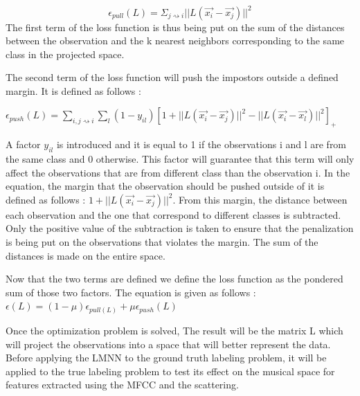 \documentclass[hidelinks,12pt]{report}
\begin{document}
 $$\epsilon_{pull}(L)=\Sigma_{j \rightsquigarrow i}||L(\vec{x_i}-\vec{x_j})||^2$$
 The first term of the loss function is thus being put on the sum of the distances between the observation and the k nearest neighbors corresponding to the same class in the projected space.\par
The second term of the loss function will push the impostors outside a defined margin. It is defined as follows : \par 
$\epsilon_{push}(L)=\sum\limits_{i, j \rightsquigarrow i}\sum\limits_{l}(1-y_{il})[1+||L(\vec{x_i}-\vec{x_j})||^2-||L(\vec{x_i}-\vec{x_l})||^2]_+$ \par 
A factor $y_{il}$ is introduced and it is equal to 1 if the observations i and l are from the same class and 0 otherwise. This factor will guarantee that this term will only affect the observations that are from different class than the observation i. In the equation, the margin that the observation should be pushed outside of it is defined as follows : $1+||L(\vec{x_i}-\vec{x_j})||^2$. From this margin, the distance between each observation and the one that correspond to different classes is subtracted. Only the positive value of the subtraction is taken to ensure that the penalization is being put on the observations that violates the margin. The sum of the distances is made on the entire space.\par 
Now that the two terms are defined we define the loss function as the pondered sum of those two factors. The equation is given as follows : 
$\epsilon(L)=(1-\mu)\epsilon_{pull(L)}+\mu \epsilon_{push}(L) $

Once the optimization problem is solved, The result will be the matrix L which will project the observations into a space that will better represent the data. Before applying the LMNN to the ground truth labeling problem, it will be applied to the true labeling problem to test its effect on the musical space for features extracted using the MFCC and the scattering.
\end{document}
